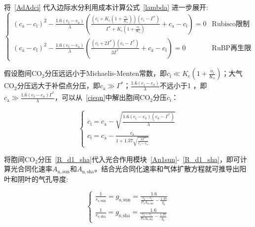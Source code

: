将~\eqref{AdAdci} 代入边际水分利用成本计算公式~\eqref{lambda} 进一步展开:
\begin{equation}\label{cieqn}
\begin{cases}
    \left(c_{\mathrm{a}}-c_{\mathrm{i}}\right)^2-\frac{1.6\left(e_{\mathrm{i}}-e_{\mathrm{a}}\right)}{\lambda}\left(\frac{\left(c_{\mathrm{i}}+K_{\mathrm{c}}\left(1+\frac{o_{\mathrm{i}}}{K_{\mathrm{o}}}\right)\right)\left(c_i-\Gamma^*\right)}{\Gamma^*+K_{\mathrm{c}}\left(1+\frac{o_{\mathrm{i}}}{K_{\mathrm{o}}}\right)}+c_{\mathrm{a}}-c_{\mathrm{i}}\right)=0 & \text{Rubisco限制}  \\
    \left(c_{\mathrm{a}}-c_{\mathrm{i}}\right)^2-\frac{1.6\left(e_{\mathrm{i}}-e_{\mathrm{a}}\right)}{\lambda}\left(\frac{\left(c_{\mathrm{i}}+2\Gamma^*\right)\left(c_i-\Gamma^*\right)}{3\Gamma^*}+c_{\mathrm{a}}-c_{\mathrm{i}}\right)=0  & \text{RuBP再生限制}
\end{cases}
\end{equation}

假设胞间$\mathrm {CO_2}$分压远远小于Michaelis-Menten常数，即$c_{\mathrm{i}}\ll K_{\mathrm{c}}\left(1+\frac{o_{\mathrm{i}}}{K_{\mathrm{o}}}\right)$；大气$\mathrm {CO_2}$分压远大于补偿点分压，即$c_{\mathrm{a}}\gg\Gamma^*$；$\frac{1.6\left(e_{\mathrm{i}}-e_{\mathrm{a}}\right)}{\lambda}$不远小于1 ，即$c_{\mathrm{a}}\gg\frac{1.6\left(e_{\mathrm{i}}-e_{\mathrm{a}}\right)\Gamma^*}{\lambda}$，可以从~\eqref{cieqn}中解出胞间$\mathrm {CO_2}$分压$c_{\mathrm{i}}$：

\begin{equation}\label{cisolu}
    \begin{cases}
    c_{\mathrm{i}}=c_{\mathrm{a}} - \sqrt{\frac{1.6\left(e_{\mathrm{i}}-e_{\mathrm{a}}\right)\left(c_{\mathrm{a}}-\Gamma^*\right)}{\lambda}} \\
    c_{\mathrm{i}}=c_{\mathrm{a}} - \frac{c_{\mathrm{a}}}{1+1.37\sqrt{\frac{\lambda \Gamma^*}{e_{\mathrm{i}}-e_{\mathrm{a}}}}}
    \end{cases}
\end{equation}

将胞间$\mathrm {CO_2}$分压~\eqref{R_d1_sha}代入光合作用模块~\eqref{An1sun}-~\eqref{R_d1_sha}，即可计算光合同化速率$A_{\mathrm{n,sun}}$和$A_{\mathrm{n,sha}}$。结合光合同化速率和气体扩散方程就可推导出阳叶和阴叶的气孔导度:

\begin{equation}\label{gssolu}
    \begin{cases}
    \frac{1}{r_{\mathrm{s,sun}}}=g_{\mathrm{s,sun}}=\frac{1.6} {\frac{c_{\mathrm{a}}-c_{\mathrm{i}}}{P_{\mathrm {a}} A_{\mathrm{n,sun}}} - \frac{1.37}{g_{\mathrm{b}}}}\\
    \frac{1}{r_{\mathrm{s,sha}}}=g_{\mathrm{s,sha}}=\frac{1.6} {\frac{c_{\mathrm{a}}-c_{\mathrm{i}}}{P_{\mathrm {a}} A_{\mathrm{n,sha}}} - \frac{1.37}{g_{\mathrm{b}}}}
    \end{cases}
\end{equation}


